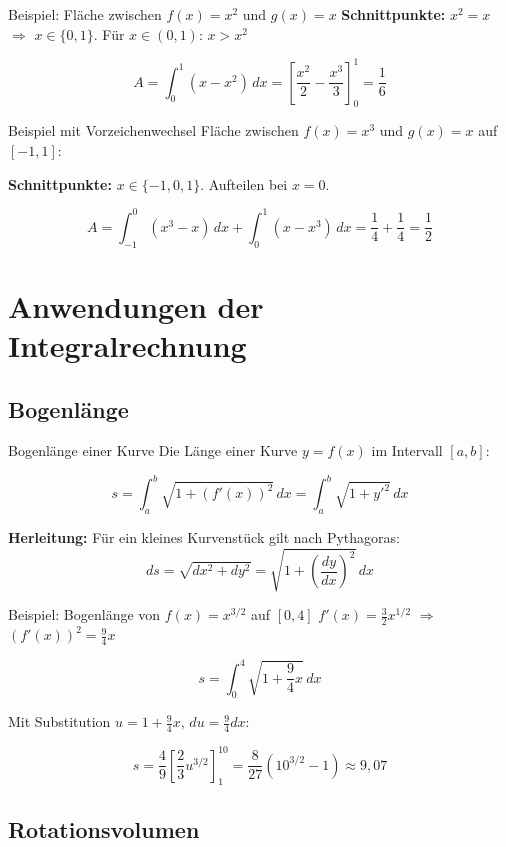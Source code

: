 \documentclass[a4paper,fontsize = 7pt]{scrartcl}
\begin{document}
\begin{subbox}{Beispiel: Fläche zwischen $f(x) = x^2$ und $g(x) = x$}
\textbf{Schnittpunkte:} $x^2 = x$ $\Rightarrow$ $x \in \{0, 1\}$. Für $x \in (0,1)$: $x > x^2$

$$A = \int_0^1 (x - x^2)\,dx = \left[\frac{x^2}{2} - \frac{x^3}{3}\right]_0^1 = \frac{1}{6}$$
\end{subbox}

\begin{subbox}{Beispiel mit Vorzeichenwechsel}
Fläche zwischen $f(x) = x^3$ und $g(x) = x$ auf $[-1, 1]$:

\textbf{Schnittpunkte:} $x \in \{-1, 0, 1\}$. Aufteilen bei $x = 0$.

$$A = \int_{-1}^{0} (x^3 - x)\,dx + \int_0^{1} (x - x^3)\,dx = \frac{1}{4} + \frac{1}{4} = \frac{1}{2}$$
\end{subbox}

\section{Anwendungen der Integralrechnung}

\subsection{Bogenlänge}

\begin{mainbox}{Bogenlänge einer Kurve}
Die Länge einer Kurve $y = f(x)$ im Intervall $[a, b]$:

$$\boxed{s = \int_a^b \sqrt{1 + \left(f'(x)\right)^2}\,dx = \int_a^b \sqrt{1 + y'^2}\,dx}$$

\textbf{Herleitung:} Für ein kleines Kurvenstück gilt nach Pythagoras:
$$ds = \sqrt{dx^2 + dy^2} = \sqrt{1 + \left(\frac{dy}{dx}\right)^2}\,dx$$
\end{mainbox}

\begin{subbox}{Beispiel: Bogenlänge von $f(x) = x^{3/2}$ auf $[0, 4]$}
$f'(x) = \frac{3}{2}x^{1/2}$ $\Rightarrow$ $(f'(x))^2 = \frac{9}{4}x$

$$s = \int_0^4 \sqrt{1 + \frac{9}{4}x}\,dx$$

Mit Substitution $u = 1 + \frac{9}{4}x$, $du = \frac{9}{4}dx$:

$$s = \frac{4}{9}\left[\frac{2}{3}u^{3/2}\right]_1^{10} = \frac{8}{27}\left(10^{3/2} - 1\right) \approx 9{,}07$$
\end{subbox}

\subsection{Rotationsvolumen}
\end{document}
